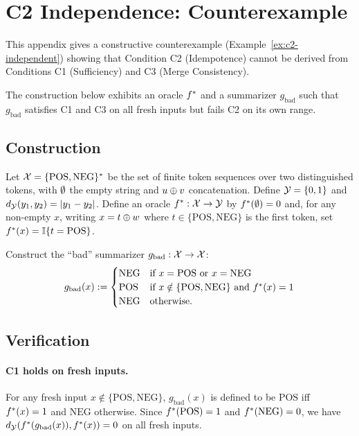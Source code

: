 \section{C2 Independence: Counterexample}\label{app:counterexample}

This appendix gives a constructive counterexample (Example~\ref{ex:c2-independent}) showing that Condition C2 (Idempotence) cannot be derived from Conditions C1 (Sufficiency) and C3 (Merge Consistency).

\begin{example}\label{ex:c2-independent}
The construction below exhibits an oracle $f^\ast$ and a summarizer $g_{\mathrm{bad}}$ such that $g_{\mathrm{bad}}$ satisfies C1 and C3 on all fresh inputs but fails C2 on its own range.
\end{example}

\subsection{Construction}

Let $\mathcal{X} = \{\text{POS}, \text{NEG}\}^\ast$ be the set of finite token sequences over two distinguished tokens, with $\emptyset$ the empty string and $u \oplus v$ concatenation.
Define $\mathcal{Y} = \{0,1\}$ and $d_{\mathcal{Y}}(y_1,y_2)=|y_1-y_2|$.
Define an oracle $f^\ast:\mathcal{X}\to\mathcal{Y}$ by $f^\ast(\emptyset)=0$ and, for any non-empty $x$, writing $x = t \oplus w$ where $t \in \{\text{POS},\text{NEG}\}$ is the first token, set $f^\ast(x)=\mathbb{I}\{t=\text{POS}\}$.

Construct the ``bad'' summarizer $g_{\mathrm{bad}}:\mathcal{X}\to\mathcal{X}$:
\[
g_{\mathrm{bad}}(x) :=
\begin{cases}
\text{NEG} & \text{if } x=\text{POS} \text{ or } x=\text{NEG} \\
\text{POS} & \text{if } x \notin \{\text{POS},\text{NEG}\} \text{ and } f^\ast(x)=1 \\
\text{NEG} & \text{otherwise.}
\end{cases}
\]

\subsection{Verification}

\paragraph{C1 holds on fresh inputs.}
For any fresh input $x \notin \{\text{POS},\text{NEG}\}$, $g_{\mathrm{bad}}(x)$ is defined to be $\text{POS}$ iff $f^\ast(x)=1$ and $\text{NEG}$ otherwise. Since $f^\ast(\text{POS})=1$ and $f^\ast(\text{NEG})=0$, we have $d_{\mathcal{Y}}(f^\ast(g_{\mathrm{bad}}(x)), f^\ast(x))=0$ on all fresh inputs.

